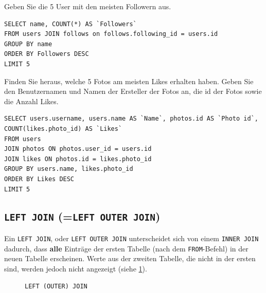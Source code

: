 \begin{myexercise}
  Geben Sie die 5 User mit den meisten Followern aus.
  \begin{myanswer}
    \begin{lstlisting}
SELECT name, COUNT(*) AS `Followers`
FROM users JOIN follows on follows.following_id = users.id
GROUP BY name
ORDER BY Followers DESC
LIMIT 5
\end{lstlisting}
  \end{myanswer}
\end{myexercise}

\begin{mychallenge}
  Finden Sie heraus, welche 5 Fotos am meisten Likes erhalten haben. Geben Sie den Benutzernamen und Namen der Ersteller der Fotos an, die id der Fotos sowie die Anzahl Likes.
  \begin{myanswer}
    \begin{lstlisting}
SELECT users.username, users.name AS `Name`, photos.id AS `Photo id`, COUNT(likes.photo_id) AS `Likes`
FROM users
JOIN photos ON photos.user_id = users.id
JOIN likes ON photos.id = likes.photo_id
GROUP BY users.name, likes.photo_id
ORDER BY Likes DESC
LIMIT 5
\end{lstlisting}
  \end{myanswer}

\end{mychallenge}

\subsection{\texorpdfstring{\lstinline|LEFT JOIN| (=\lstinline|LEFT OUTER JOIN|)}{LEFT JOIN (=LEFT OUTER JOIN)}}
Ein \lstinline|LEFT JOIN|, oder \lstinline|LEFT OUTER JOIN| unterscheidet sich von einem \lstinline|INNER JOIN| dadurch, dass \textbf{alle} Einträge der ersten Tabelle (nach dem \lstinline|FROM|-Befehl) in der neuen Tabelle erscheinen. Werte aus der zweiten Tabelle, die nicht in der ersten sind, werden jedoch nicht angezeigt (siehe \cref{fig:venn-left-join}).

\begin{figure}[H]
  \centering
  \caption{\lstinline|LEFT (OUTER) JOIN|}
  \label{fig:venn-left-join}
\end{figure}


